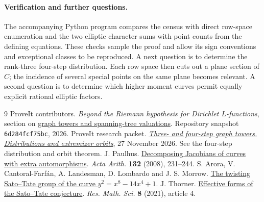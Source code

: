 \documentclass[11pt]{article}
\newcommand{\gh}{https://github.com/VladimirReshetnikov/ProveIt/blob/6d284fcf75bc3a91bb2e79ba7636f94724bff62c/Analysis/GeneralizedRiemannHypothesis}
\begin{document}
\paragraph{Verification and further questions.}
The accompanying Python program compares the census with direct
row-space enumeration and the two elliptic character sums with
point counts from the defining equations. These checks sample the
proof and allow its sign conventions and exceptional classes to be
reproduced. A next question is to determine the rank-three
four-step distribution. Each row space then cuts out a plane
section of $C$; the incidence of several special points on the
same plane becomes relevant. A second question is to determine
which higher moment curves permit equally explicit rational
elliptic factors.

\begin{thebibliography}{9}
 ProveIt contributors. \emph{Beyond the Riemann
hypothesis for Dirichlet $L$-functions}, section on
\href{\gh/Article/sections/gra.tex}{graph towers and spanning-tree
valuations}. Repository snapshot \texttt{6d284fcf75bc}, 2026.
 ProveIt research packet.
\href{\gh/Research/short_tower_distributions_2026-11-27/short_tower_distributions.tex}{\emph{Three- and four-step graph towers. Distributions and extremizer orbits}},
27 November 2026. See the four-step distribution and orbit theorem.
 J. Paulhus. \href{https://doi.org/10.4064/aa132-3-3}{Decomposing Jacobians of curves with extra automorphisms}.
\emph{Acta Arith.} \textbf{132} (2008), 231--244.
 S. Arora, V. Cantoral-Farf\'an, A. Landesman,
D. Lombardo and J. S. Morrow.
\href{https://arxiv.org/abs/1608.06784}{The twisting Sato--Tate group of the curve $y^2=x^8-14x^4+1$}.
 J. Thorner.
\href{https://arxiv.org/abs/2002.10450}{Effective forms of the Sato--Tate conjecture}.
\emph{Res. Math. Sci.} \textbf{8} (2021), article 4.
\end{thebibliography}
\end{document}

